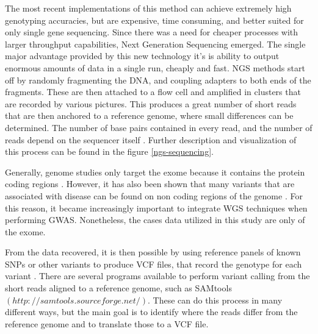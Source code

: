 The most recent implementations of this method can achieve extremely high genotyping accuracies, but are expensive, time consuming, and better suited for only single gene sequencing. Since there was a need for cheaper processes with larger throughput capabilities, Next Generation Sequencing emerged. The single major advantage provided by this new technology it's is ability to output enormous amounts of data in a single run, cheaply and fast. \gls{NGS} methods start off by randomly fragmenting the \gls{DNA}, and coupling adapters to both ends of the fragments. These are then attached to a flow cell and amplified in clusters that are recorded by various pictures. This produces a great number of short reads that are then anchored to a reference genome, where small differences can be determined. The number of base pairs contained in every read, and the number of reads depend on the sequencer itself \cite{ansorge2009next}. Further description and visualization of this process can be found in the figure \ref{ngs-sequencing}.

Generally, genome studies only target the exome because it contains the protein coding regions \cite{choi2009genetic}. However, it has also been shown that many variants that are associated with disease can be found on non coding regions of the genome \cite{manolio2009finding}. For this reason, it became increasingly important to integrate \gls{WGS} techniques when performing \gls{GWAS}. Nonetheless, the cases data utilized in this study are only of the exome. 

From the data recovered, it is then possible by using reference panels of known \gls{SNP}s or other variants to produce \gls{VCF} files, that record the genotype for each variant \cite{zook2014integrating,mccarthy2016reference}. There are several programs available to perform variant calling from the short reads aligned to a reference genome, such as SAMtools $(http://samtools.sourceforge.net/)$. These can do this process in many different ways, but the main goal is to identify where the reads differ from the reference genome and to translate those to a \gls{VCF} file.


